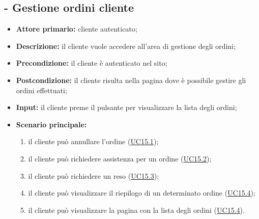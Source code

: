\subsection{ - Gestione ordini cliente}
\begin{itemize}
    \item \textbf{Attore primario:} cliente autenticato;
    \item \textbf{Descrizione:} il cliente vuole accedere all'area di gestione degli ordini;
    \item \textbf{Precondizione:} il cliente è autenticato nel sito;
    \item \textbf{Postcondizione:} il cliente risulta nella pagina dove è possibile gestire gli ordini effettuati;
    \item \textbf{Input:} il cliente preme il pulsante per visualizzare la lista degli ordini;
    \item \textbf{Scenario principale:}
          \begin{enumerate}
              \item il cliente può annullare l'ordine (\hyperref[UC15.1]{UC15.1});
              \item il cliente può richiedere assistenza per un ordine (\hyperref[UC15.2]{UC15.2});
              \item il cliente può richiedere un reso (\hyperref[UC15.3]{UC15.3});
              \item il cliente può visualizzare il riepilogo di un determinato ordine (\hyperref[UC15.4]{UC15.4});
              \item il cliente può visualizzare la pagina con la lista degli ordini (\hyperref[UC15.4]{UC15.4}).
          \end{enumerate}
\end{itemize}

\stepsubUserCase
